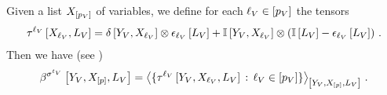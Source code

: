 \begin{theorem}
    \label{the:varSelectorDecomposition}
    Given a list $X_{[p_{V}]}$ of variables, we define for each $\ell_{V}\in[p_{V}]$ the tensors
    \begin{align*}
        \tau^{{\ell_{V}}}\left[X_{\ell_{V}},L_{V}\right]
        = \delta\left[Y_{V},X_{\ell_{V}}\right] \otimes \epsilon_{\ell_{V}}\left[L_{V}\right]
        + \mathbb{I}\left[Y_{V},X_{\ell_{V}}\right]
        \otimes \left(\mathbb{I}\left[L_{V}\right] - \epsilon_{\ell_{V}}\left[L_{V}\right] \right) \, .
    \end{align*}
    Then we have (see )
    \begin{align*}
        \bsencodingofat{\vselectionmap}{\vselectionheadvar,\catvariableof{[\seldim]},\selvariableof{\vselectionsymbol}}
    = \contractionof{
        \{\selectorcomponentofat{\selindexof{\vselectionsymbol}}{\vselectionheadvar,\catvariableof{\selindexof{\vselectionsymbol}},\selvariableof{\vselectionsymbol}} \wcols \selindexofin{\vselectionsymbol}\}
    }{\vselectionheadvar,\catvariableof{[\seldim]},\selvariableof{\vselectionsymbol}} \, .
    \end{align*}
\end{theorem}
